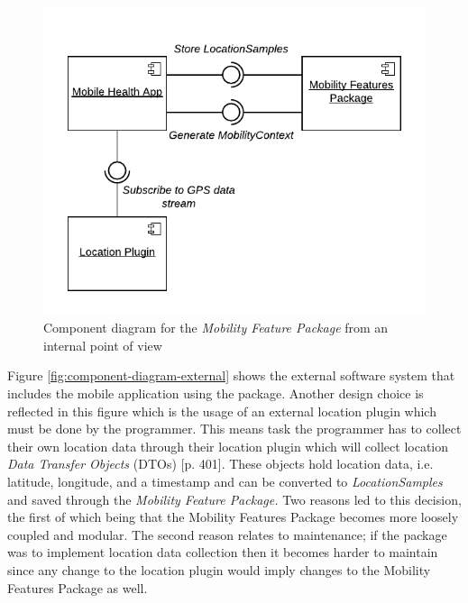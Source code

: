 \begin{figure}[h]
\centering
\includegraphics[width=\textwidth]{images/diagrams/component-external.pdf}
\caption{Component diagram for the \textit{Mobility Feature Package} from an internal point of view}
\label{fig:component-diagram-internal}
\end{figure}

Figure \ref{fig:component-diagram-external} shows the external software system that includes the mobile application using the package. Another design choice is reflected in this figure which is the usage of an external location plugin which must be done by the programmer. This means task the programmer has to collect their own location data through their location plugin which will collect location \textit{Data Transfer Objects} (DTOs) \cite{fowler-PEEA} [p. 401]. These objects hold location data, i.e. latitude, longitude, and a timestamp and can be converted to \textit{LocationSamples} and saved through the \textit{Mobility Feature Package.}
Two reasons led to this decision, the first of which being that the Mobility Features Package becomes more loosely coupled and modular. The second reason relates to maintenance; if the package was to implement location data collection then it becomes harder to maintain since any change to the location plugin would imply changes to the Mobility Features Package as well. 

